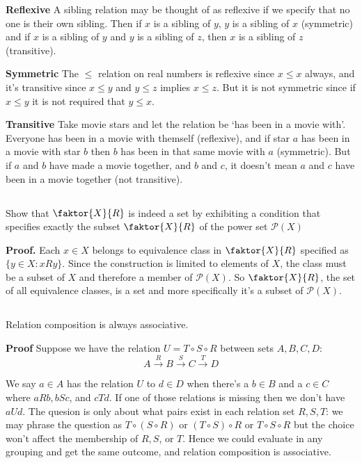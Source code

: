 \documentclass{article}
\begin{document}
\textbf{Reflexive} A sibling relation may be thought of as reflexive if we specify that no one is their own sibling. Then if $x$ is a sibling of $y$, $y$ is a sibling of $x$ (symmetric) and if $x$ is a sibling of $y$ and $y$ is a sibling of $z$, then $x$ is a sibling of $z$ (transitive).

\textbf{Symmetric} The $\leq$ relation on real numbers is reflexive since $x \leq x$ always, and it's transitive since $x \leq y$ and $y \leq z$ implies $x \leq z$. But it is not symmetric since if $x \leq y$ it is not required that $y \leq x$. 

\textbf{Transitive} Take movie stars and let the relation be `has been in a movie with'. Everyone has been in a movie with themself (reflexive), and if star $a$ has been in a movie with star $b$ then $b$ has been in that same movie with $a$ (symmetric). But if $a$ and $b$ have made a movie together, and $b$ and $c$, it doesn't mean $a$ and $c$ have been in a movie together (not transitive).

\subsection{} Show that $\faktor{X}{R}$ is indeed a set by exhibiting a condition that specifies exactly the subset $\faktor{X}{R}$ of the power set $\mathscr{P}(X)$

\textbf{Proof.} Each $x \in X$ belongs to equivalence class in $\faktor{X}{R}$ specified as $\{y \in X: xRy\}$. Since the construction is limited to elements of $X$, the class must be a subset of $X$ and therefore a member of $\mathscr{P}(X)$. So $\faktor{X}{R}$, the set of all equivalence classes, is a set and more specifically it's a subset of $\mathscr{P}(X)$.


\subsection{} Relation composition is always associative. 

\textbf{Proof} Suppose we have the relation $U = T \circ S \circ R$ between sets $A, B, C, D$:
$$A \stackrel{R}{\longrightarrow} B \stackrel{S}{\longrightarrow} C \stackrel{T}{\longrightarrow}D$$

We say $a \in A$ has the relation $U$ to $d \in D$ when there's a $b \in B$ and a $c \in C$ where $aRb, bSc$, and $cTd$. If one of those relations is missing then we don't have $aUd$. The quesion is only about what pairs exist in each relation set $R, S, T$: we may phrase the question as $T \circ (S \circ R)$ or $(T \circ S) \circ R$ or $T \circ S \circ R$ but the choice won't affect the membership of $R, S$, or $T$. Hence we could evaluate in any grouping and get the same outcome, and relation composition is associative.
\end{document}
